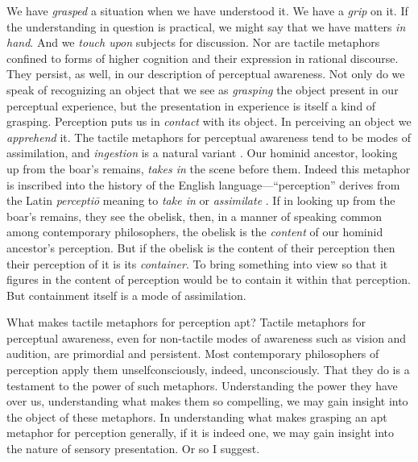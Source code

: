 We have \emph{grasped} a situation when we have understood it. We have a \emph{grip} on it. If the understanding in question is practical, we might say that we have matters \emph{in hand}. And we \emph{touch upon} subjects for discussion. Nor are tactile metaphors confined to forms of higher cognition and their expression in rational discourse. They persist, as well, in our description of perceptual awareness. Not only do we speak of recognizing an object that we see as \emph{grasping} the object present in our perceptual experience, but the presentation in experience is itself a kind of grasping. Perception puts us in \emph{contact} with its object. In perceiving an object we \emph{apprehend} it. The tactile metaphors for perceptual awareness tend to be modes of assimilation, and \emph{ingestion} is a natural variant \citep[see]{Johnston:2006uq,Price:1932fk}. Our hominid ancestor, looking up from the boar's remains, \emph{takes in} the scene before them. Indeed this metaphor is inscribed into the history of the English language---``perception'' derives from the Latin \emph{perceptiō} meaning to \emph{take in} or \emph{assimilate} \citep[102]{Burnyeat:1979mv}. If in looking up from the boar's remains, they see the obelisk, then, in a manner of speaking common among contemporary philosophers, the obelisk is the \emph{content} of our hominid ancestor's perception. But if the obelisk is the content of their perception then their perception of it is its \emph{container}. To bring something into view so that it figures in the content of perception would be to contain it within that perception. But containment itself is a mode of assimilation. 

What makes tactile metaphors for perception apt? Tactile metaphors for perceptual awareness, even for non-tactile modes of awareness such as vision and audition, are primordial and persistent. Most contemporary philosophers of perception apply them unselfconsciously, indeed, unconsciously. That they do is a testament to the power of such metaphors. Understanding the power they have over us, understanding what makes them so compelling, we may gain insight into the object of these metaphors. In understanding what makes grasping an apt metaphor for perception generally, if it is indeed one, we may gain insight into the nature of sensory presentation. Or so I suggest.

